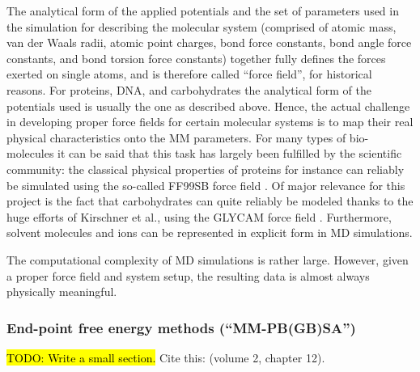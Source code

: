 The analytical form of the applied potentials and the set of parameters used in
the simulation for describing the molecular system (comprised of atomic mass,
van der Waals radii, atomic point charges, bond force constants, bond angle
force constants, and bond torsion force constants) together fully defines the
forces exerted on single atoms, and is therefore called \enquote{force field},
for historical reasons. For proteins, DNA, and carbohydrates the analytical form
of the potentials used is usually the one as described above. Hence, the actual
challenge in developing proper force fields for certain molecular systems is to
map their real physical characteristics onto the MM parameters. For many types
of bio-molecules it can be said that this task has largely been fulfilled by the
scientific community: the classical physical properties of proteins for instance
can reliably be simulated using the so-called FF99SB force field
\cite{ff99sbvalidation_2009}. Of major relevance for this project is  the fact
that carbohydrates can quite reliably be modeled thanks to the huge efforts of
Kirschner et al., using the GLYCAM force field \cite{kirschner_glycam06:_2008}.
Furthermore, solvent molecules and ions can be represented in explicit form in
MD simulations.

The computational complexity of MD simulations is rather large. However, given a
proper force field and system setup, the resulting data is almost always
physically meaningful.


\subsubsection{End-point free energy methods (\enquote{MM-PB(GB)SA})}
\label{methods:mmpbsa_mmgbsa}

\hl{TODO: Write a small section.}
Cite this: \cite{schlick_innovationsdynamics_2012} (volume 2, chapter 12).
\lipsum[1-5]
